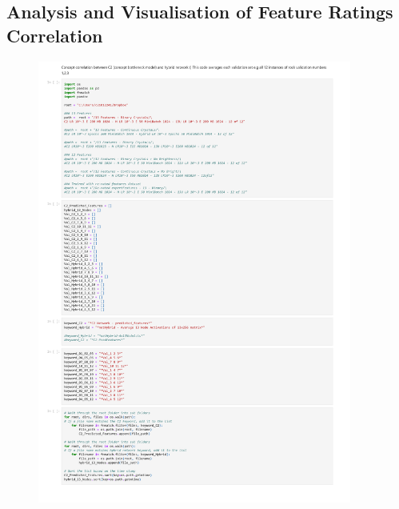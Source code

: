 \subsection{Analysis and Visualisation of Feature Ratings Correlation}
\begin{figure}[H]
  \centering
    \includegraphics[width=0.92\textwidth, height=0.92\textheight]{Code/Correlation_Visualisation_and_CSV_for_Average_Feature_Ratings_-_12_of_12.pdf}
  \label{fig:Correlation Visualisation for Average Feature Ratings}
\end{figure}

